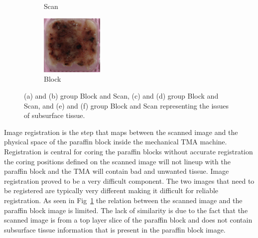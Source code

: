 \documentclass[a4paper,10pt,oneside]{article}
\begin{document}
\begin{figure}[hbtp]
\begin{subfigure}[b]{.2\textwidth}
    \caption{Scan}
  \end{subfigure}
  \begin{subfigure}[b]{.2\textwidth}
	  \includegraphics[width=3cm]{images/PO14004821_B3.JPG} 
    \caption{Block}
  \end{subfigure}
	\caption{(a) and (b) group Block and Scan, (c) and (d) group Block and Scan, and (e) and (f) group Block and Scan representing the issues of subsurface tissue.}
	\label{fig:subsurface}
\end{figure}
Image registration is the step that maps between the scanned image and the physical space of the paraffin block inside the mechanical TMA machine. Registration is central for coring the paraffin blocks without accurate registration the coring positions defined on the scanned image will not lineup with the paraffin block and the TMA will contain bad and unwanted tissue. Image registration proved to be a very difficult component. The two images that need to be registered are typically very different making it difficult for reliable registration. As seen in Fig~\ref{fig:subsurface} the relation between the scanned image and the paraffin block image is limited. The lack of similarity is due to the fact that the scanned image is from a top layer slice of the paraffin block and does not contain subsurface tissue information that is present in the paraffin block image.
\end{document}
